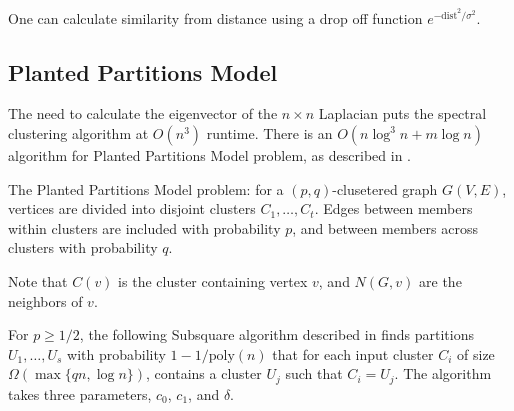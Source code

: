 {	One can calculate similarity from distance using a drop off function $e^{-\mathrm{dist}^2/\sigma^2}$.
	
	\subsection{Planted Partitions Model}
	
	The need to calculate the eigenvector of the $n\times n$ Laplacian puts the spectral clustering algorithm at $O(n^3)$ runtime. There is an $O(n \log^3 n + m \log n)$ algorithm for Planted Partitions Model problem, as described in \cite{bsh10}.
	
	The Planted Partitions Model problem: for a $(p,q)$-clusetered graph $G(V,E)$, vertices are divided into disjoint clusters $C_1, \ldots, C_t$. Edges between members within clusters are included with probability $p$, and between members across clusters with probability $q$.
	
	Note that $C(v)$ is the cluster containing vertex $v$, and $N(G,v)$ are the neighbors of $v$.
	
	For $p \geq 1/2$, the following Subsquare algorithm described in \cite{bsh10} finds partitions $U_1, \ldots, U_s$ with probability $1-1/\mathrm{poly}(n)$ that for each input cluster $C_i$ of size $\Omega(\max \{qn, \log n \})$, contains a cluster $U_j$ such that $C_i=U_j$. The algorithm takes three parameters, $c_0$, $c_1$, and $\delta$.
	
}
